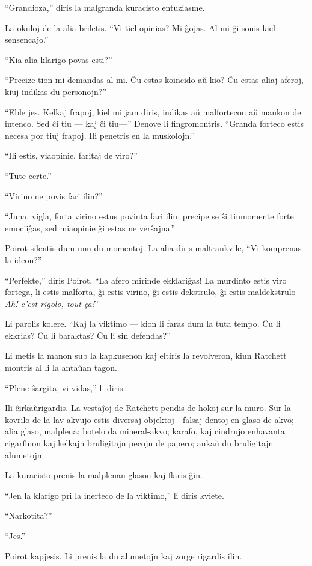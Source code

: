 ``Grandioza,'' diris la malgranda kuracisto entuziasme.

La okuloj de la alia briletis. ``Vi tiel opinias? Mi ĝojas. Al mi ĝi sonis kiel sensencaĵo.''

``Kia alia klarigo povas esti?''

``Precize tion mi demandas al mi. Ĉu estas koincido aŭ kio? Ĉu estas aliaj aferoj, kiuj indikas du personojn?''

``Eble jes. Kelkaj frapoj, kiel mi jam diris, indikas aŭ malfortecon aŭ mankon de intenco. Sed ĉi tiu --- kaj ĉi tiu---'' Denove li fingromontris. ``Granda forteco estis necesa por tiuj frapoj. Ili penetris en la muskolojn.''

``Ili estis, viaopinie, faritaj de viro?''

``Tute certe.''

``Virino ne povis fari ilin?''

``Juna, vigla, forta virino estus povinta fari ilin, precipe se ŝi tiumomente forte emociiĝas, sed miaopinie ĝi estas ne verŝajna.''

Poirot silentis dum unu du momentoj. La alia diris maltrankvile, ``Vi komprenas la ideon?''

``Perfekte,'' diris Poirot. ``La afero mirinde ekklariĝas! La murdinto estis viro fortega, li estis malforta, ĝi estis virino, ĝi estis dekstrulo, ĝi estis maldekstrulo --- \emph{Ah! c'est rigolo, tout ça!}''

Li parolis kolere. ``Kaj la viktimo --- kion li faras dum la tuta tempo. Ĉu li ekkrias? Ĉu li baraktas? Ĉu li sin defendas?''

Li metis la manon sub la kapkusenon kaj eltiris la revolveron, kiun Ratchett montris al li la antaŭan tagon.

``Plene ŝargita, vi vidas,'' li diris.

Ili ĉirkaŭrigardis. La vestaĵoj de Ratchett pendis de hokoj sur la muro. Sur la kovrilo de la lav-akvujo estis diversaj objektoj---falsaj dentoj en glaso de akvo; alia glaso, malplena; botelo da mineral-akvo; karafo, kaj cindrujo enhavanta cigarfinon kaj kelkajn bruligitajn pecojn de papero; ankaŭ du bruligitajn alumetojn.

La kuracisto prenis la malplenan glason kaj flaris ĝin.

``Jen la klarigo pri la inerteco de la viktimo,'' li diris kviete.

``Narkotita?''

``Jes.''

Poirot kapjesis. Li prenis la du alumetojn kaj zorge rigardis ilin.

